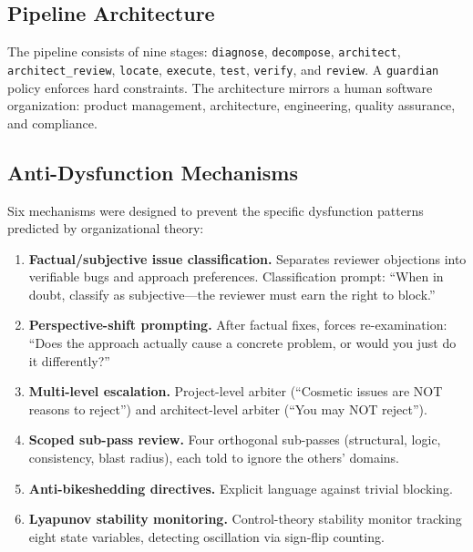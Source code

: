 \documentclass[11pt,a4paper]{article}
\begin{document}
\subsection{Pipeline Architecture}

The pipeline consists of nine stages: \texttt{diagnose}, \texttt{decompose}, \texttt{architect}, \texttt{architect\_review}, \texttt{locate}, \texttt{execute}, \texttt{test}, \texttt{verify}, and \texttt{review}. A \texttt{guardian} policy enforces hard constraints. The architecture mirrors a human software organization: product management, architecture, engineering, quality assurance, and compliance.

\subsection{Anti-Dysfunction Mechanisms}

Six mechanisms were designed to prevent the specific dysfunction patterns predicted by organizational theory:

\begin{enumerate}
\item \textbf{Factual/subjective issue classification.} Separates reviewer objections into verifiable bugs and approach preferences. Classification prompt: ``When in doubt, classify as subjective---the reviewer must earn the right to block.''

\item \textbf{Perspective-shift prompting.} After factual fixes, forces re-examination: ``Does the approach actually cause a concrete problem, or would you just do it differently?''

\item \textbf{Multi-level escalation.} Project-level arbiter (``Cosmetic issues are NOT reasons to reject'') and architect-level arbiter (``You may NOT reject'').

\item \textbf{Scoped sub-pass review.} Four orthogonal sub-passes (structural, logic, consistency, blast radius), each told to ignore the others' domains.

\item \textbf{Anti-bikeshedding directives.} Explicit language against trivial blocking.

\item \textbf{Lyapunov stability monitoring.} Control-theory stability monitor tracking eight state variables, detecting oscillation via sign-flip counting.
\end{enumerate}
\end{document}
